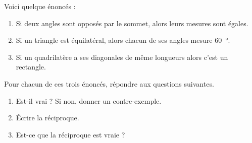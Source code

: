 
\begin{exercice}\label{exosmath-0853}

    Voici quelque énoncés :
    \begin{enumerate}
        \item
            Si deux angles sont opposés par le sommet, alors leurs mesures sont égales.
        \item
            Si un triangle est équilatéral, alors chacun de ses angles mesure \SI{60}{\degree}.
        \item
            Si un quadrilatère a ses diagonales de même longueurs alors c'est un rectangle.
    \end{enumerate}
    
    Pour chacun de ces trois énoncés, répondre aux questions suivantes.
    \begin{enumerate}
        \item
            Est-il vrai ? Si non, donner un contre-exemple.
        \item
            Écrire la réciproque.
        \item
            Est-ce que la réciproque est vraie ?
    \end{enumerate}

\end{exercice}
